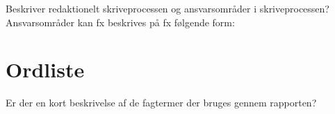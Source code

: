 Beskriver redaktionelt skriveprocessen og ansvarsområder i skriveprocessen?\\
Ansvarsområder kan fx beskrives på fx følgende form:

\section{Ordliste}
Er der en kort beskrivelse af de fagtermer der bruges gennem rapporten?
